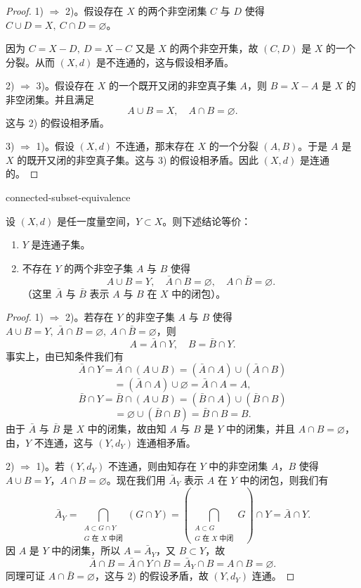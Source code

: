\begin{proof}

1) $\Longrightarrow$ 2)。假设存在 $X$ 的两个非空闭集 $C$ 与 $D$ 使得 $C\cup D=X,\ C\cap D=\varnothing$。

因为 $C=X-D,\ D=X-C$ 又是 $X$ 的两个非空开集，故 $(C,D)$ 是 $X$ 的一个分裂。从而 $(X,d)$ 是不连通的，这与假设相矛盾。

2) $\Longrightarrow$ 3)。假设存在 $X$ 的一个既开又闭的非空真子集 $A$，则 $B=X-A$ 是 $X$ 的非空闭集。并且满足
\[A\cup B=X,\quad A\cap B=\varnothing.\]
这与 2) 的假设相矛盾。

3) $\Longrightarrow$ 1)。假设 $(X,d)$ 不连通，那末存在 $X$ 的一个分裂 $(A,B)$。于是 $A$ 是 $X$ 的既开又闭的非空真子集。这与 3) 的假设相矛盾。因此 $(X,d)$ 是连通的。

\end{proof}

\begin{mythm}{}{connected-subset-equivalence}

设 $(X,d)$ 是任一度量空间，$Y\subset X$。则下述结论等价：

\begin{enumerate}[label=\arabic{enumi})]
\item $Y$ 是连通子集。
\item 不存在 $Y$ 的两个非空子集 $A$ 与 $B$ 使得
\[A\cup B=Y,\quad\bar A\cap B=\varnothing,\quad A\cap\bar B=\varnothing.\]
（这里 $\bar A$ 与 $\bar B$ 表示 $A$ 与 $B$ 在 $X$ 中的闭包）。
\end{enumerate}

\end{mythm}

\begin{proof}

1) $\Longrightarrow$ 2)。若存在 $Y$ 的非空子集 $A$ 与 $B$ 使得 $A\cup B=Y,\ \bar A\cap B=\varnothing,\ A\cap\bar B=\varnothing$，则
\[A=\bar A\cap Y,\quad B=\bar B\cap Y.\]
事实上，由已知条件我们有
\[\bar{A}\cap Y=\bar{A}\cap(A\cup B)=(\bar{A}\cap A)\cup(\bar{A}\cap B)\]
\[=(\bar{A}\cap A)\cup\varnothing=\bar{A}\cap A=A,\]
\[\bar{B}\cap Y=\bar{B}\cap(A\cup B)=(\bar{B}\cap A)\cup(\bar{B}\cap B)\]
\[=\varnothing\cup(\bar{B}\cap B)=\bar{B}\cap B=B.\]
由于 $\bar{A}$ 与 $\bar{B}$ 是 $X$ 中的闭集，故由知 $A$ 与 $B$ 是 $Y$ 中的闭集，并且 $A\cap B=\varnothing$，由，$Y$ 不连通，这与 $(Y,d_Y)$ 连通相矛盾。

2) $\Longrightarrow$ 1)。若 $(Y,d_Y)$ 不连通，则由知存在 $Y$ 中的非空闭集 $A$，$B$ 使得 $A\cup B=Y$，$A\cap B=\varnothing$。现在我们用 $\bar{A}_Y$ 表示 $A$ 在 $Y$ 中的闭包，则我们有
\[\bar{A}_Y=\bigcap_{\substack{A\subset G\cap Y\\ G\text{ 在 }X\text{ 中闭}}}(G\cap Y)=\left(\bigcap_{\substack{A\subset G\\ G\text{ 在 }X\text{ 中闭}}}G\right)\cap Y=\bar{A}\cap Y.\]
因 $A$ 是 $Y$ 中的闭集，所以 $A=\bar{A}_Y$，又 $B\subset Y$，故
\[\bar{A}\cap B=\bar{A}\cap Y\cap B=\bar{A}_Y\cap B=A\cap B=\varnothing.\]
同理可证 $A\cap\bar{B}=\varnothing$，这与 2) 的假设矛盾，故 $(Y,d_Y)$ 连通。

\end{proof}

